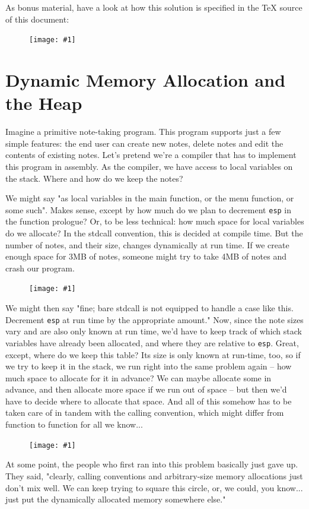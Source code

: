 \documentclass{article}
\newcommand{\displayimage}[1] {
\begin{figure}[H]
    \centering
    \texttt{[image: \#1]} 
\end{figure}
}
\newcommand{\wrapimageright}[1] {
    \begin{figure}
        \begin{center}
            \texttt{[image: \#1]} 
        \end{center}
    \end{figure}
}
\newcommand{\wrapimageleft}[1] {
    \begin{figure}
        \begin{center}
            \texttt{[image: \#1]} 
        \end{center}
    \end{figure}
}
\newcommand{\xcode}[2]{\colorbox{ubuntuback}{\lstinline[language=#1]|#2|}}
\newcommand{\asm}[1]{\xcode{{[x86masm]assembler}}{#1}}
\begin{document}
As bonus material, have a look at how this solution is specified in the TeX source of this document:

\displayimage{./exercises/14_cmd2/tex_source.png}

\section{Dynamic Memory Allocation and the Heap}

Imagine a primitive note-taking program. This program supports just a few simple features: the end user can create new notes, delete notes and edit the contents of existing notes.  Let's pretend we're a compiler that has to implement this program in assembly. As the compiler, we have access to local variables on the stack. Where and how do we keep the notes?

We might say "as local variables in the main function, or the menu function, or some such". Makes sense, except by how much do we plan to decrement \asm{esp} in the function prologue? Or, to be less technical: how much space for local variables do we allocate? In the stdcall convention, this is decided at compile time. But the number of notes, and their size, changes dynamically at run time. If we create enough space for 3MB of notes, someone might try to take 4MB of notes and crash our program.

\wrapimageright{./images/c_heap.png}
We might then say "fine; bare stdcall is not equipped to handle a case like this. Decrement \asm{esp} at run time by the appropriate amount." Now, since the note sizes vary and are also only known at run time, we'd have to keep track of which stack variables have already been allocated, and where they are relative to \asm{esp}. Great, except, where do we keep this table? Its size is only known at run-time, too, so if we try to keep it in the stack, we run right into the same problem again -- how much space to allocate for it in advance? We can maybe allocate some in advance, and then allocate more space if we run out of space -- but then we'd have to decide where to allocate that space. And all of this somehow has to be taken care of in tandem with the calling convention, which might differ from function to function for all we know... 

\wrapimageleft{./images/process_memory.jpg}
At some point, the people who first ran into this problem basically just gave up. They said, "clearly, calling conventions and arbitrary-size memory allocations just don't mix well. We can keep trying to square this circle, or, we could, you know... just put the dynamically allocated memory somewhere else."
\end{document}
